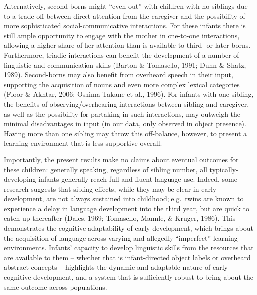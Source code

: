 \documentclass[
  english,
  man,floatsintext]{apa6}
\begin{document}
Alternatively, second-borns might \enquote{even out} with children with no siblings due to a trade-off between direct attention from the caregiver and the possibility of more sophisticated social-communicative interactions. For these infants there is still ample opportunity to engage with the mother in one-to-one interactions, allowing a higher share of her attention than is available to third- or later-borns. Furthermore, triadic interactions can benefit the development of a number of linguistic and communication skills (Barton \& Tomasello, 1991; Dunn \& Shatz, 1989). Second-borns may also benefit from overheard speech in their input, supporting the acquisition of nouns and even more complex lexical categories (Floor \& Akhtar, 2006; Oshima-Takane et al., 1996). For infants with one sibling, the benefits of observing/overhearing interactions between sibling and caregiver, as well as the possibility for partaking in such interactions, may outweigh the minimal disadvantages in input (in our data, only observed in object presence). Having more than one sibling may throw this off-balance, however, to present a learning environment that is less supportive overall.

Importantly, the present results make no claims about eventual outcomes for these children: generally speaking, regardless of sibling number, all typically-developing infants generally reach full and fluent language use. Indeed, some research suggests that sibling effects, while they may be clear in early development, are not always sustained into childhood; e.g.~twins are known to experience a delay in language development into the third year, but are quick to catch up thereafter (Dales, 1969; Tomasello, Mannle, \& Kruger, 1986). This demonstrates the cognitive adaptability of early development, which brings about the acquisition of language across varying and allegedly \enquote{imperfect} learning environments. Infants' capacity to develop linguistic skills from the resources that are available to them -- whether that is infant-directed object labels or overheard abstract concepts -- highlights the dynamic and adaptable nature of early cognitive development, and a system that is sufficiently robust to bring about the same outcome across populations.
\end{document}
